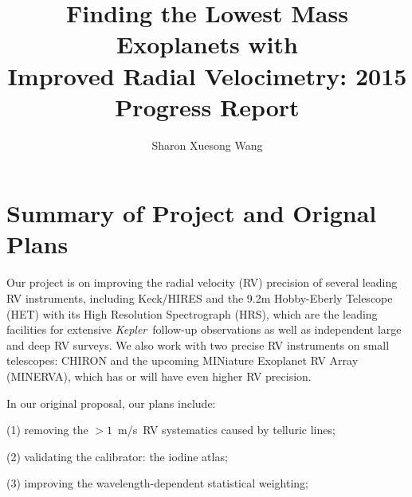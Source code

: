 \documentclass[12pt]{article}
\def\mps{m/s}
\def\kepler{{\it Kepler}}
\def\minerva{MINERVA}
\begin{document}

\title{\vspace{-45pt} \bf \Large Finding the Lowest Mass Exoplanets with
  \\ Improved Radial Velocimetry: 2015 Progress Report \vspace{-15pt}}
\author{\normalsize Sharon Xuesong Wang}
\date{}
\maketitle

\vspace{-40pt}
\section{Summary of Project and Orignal Plans}
\vspace{-5pt}

Our project is on improving the radial velocity (RV) precision of
several leading RV instruments, including Keck/HIRES and the 9.2m
Hobby-Eberly Telescope (HET) with its High Resolution Spectrograph
(HRS), which are the leading facilities for extensive
\kepler\ follow-up observations as well as independent large and deep
RV surveys. We also work with two precise RV instruments on small
telescopes: CHIRON and the upcoming MINiature Exoplanet RV Array
(\minerva), which has or will have even higher RV precision.

In our original proposal, our plans include:

(1) removing the $>1$~\mps\ RV systematics caused by telluric lines;

(2) validating the calibrator: the iodine atlas;

(3) improving the wavelength-dependent statistical weighting;
\end{document}
